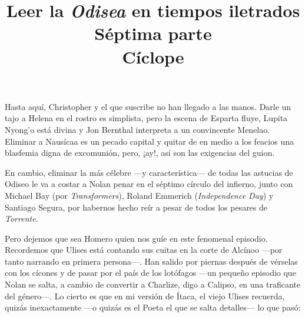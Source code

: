 \documentclass[11pt,a4paper]{article}
\title{Leer la \emph{Odisea} en tiempos iletrados \\ Séptima parte \\ Cíclope}
\author{}
\date{}
\begin{document}
\maketitle

Hasta aquí, Christopher y el que suscribe no han llegado a las manos. Darle un tajo a Helena en el rostro es simplista, pero la escena de Esparta fluye, Lupita Nyong'o está divina y Jon Bernthal interpreta a un convincente Menelao. Eliminar a Nausícaa es un pecado capital y quitar de en medio a los feacios una blasfemia digna de excomunión, pero, ¡ay!, así son las exigencias del guion.

En cambio, eliminar la más célebre ---y característica--- de todas las astucias de Odiseo le va a costar a Nolan penar en el séptimo círculo del infierno, junto con Michael Bay (por \emph{Transformers}), Roland Emmerich (\emph{Independence Day}) y Santiago Segura, por habernos hecho reír a pesar de todos los pesares de \emph{Torrente}.

Pero dejemos que sea Homero quien nos guíe en este fenomenal episodio. Recordemos que Ulises está contando sus cuitas en la corte de Alcínoo ---por tanto narrando en primera persona---. Han salido por piernas después de vérselas con los cícones y de pasar por el país de los lotófagos ---un pequeño episodio que Nolan se salta, a cambio de convertir a Charlize, digo a Calipso, en una traficante del género---. Lo cierto es que en mi versión de Ítaca, el viejo Ulises recuerda, quizás inexactamente ---o quizás es el Poeta el que se salta detalles--- lo que pasó:
\end{document}
